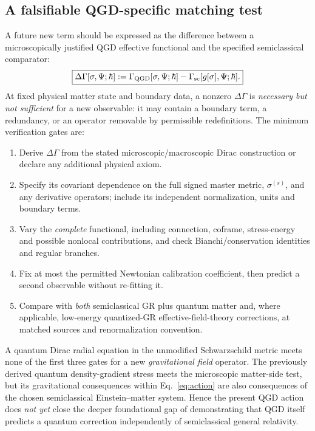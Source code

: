 \documentclass[11pt,a4paper]{article}
\begin{document}
\subsection{A falsifiable QGD-specific matching test}
\label{sec:delta-action}
A future new term should be expressed as the difference between a
microscopically justified QGD effective functional and the specified
semiclassical comparator:
\begin{equation}\label{eq:delta-gamma}
\boxed{\displaystyle
\Delta\Gamma[\sigma,\Psi;\hbar]
:=\Gamma_{\rm QGD}[\sigma,\Psi;\hbar]
-\Gamma_{\rm sc}[g[\sigma],\Psi;\hbar].}
\end{equation}
At fixed physical matter state and boundary data, a nonzero
$\Delta\Gamma$ is \emph{necessary but not sufficient} for a new
observable: it may contain a boundary term, a redundancy, or an
operator removable by permissible redefinitions. The minimum
verification gates are:
\begin{enumerate}
\item Derive $\Delta\Gamma$ from the stated microscopic/macroscopic
 Dirac construction or declare any additional physical axiom.
\item Specify its covariant dependence on the full signed master
 metric, $\sigma^{(s)}$, and any derivative operators; include its
 independent normalization, units and boundary terms.
\item Vary the \emph{complete} functional, including connection,
 coframe, stress-energy and possible nonlocal contributions, and
 check Bianchi/conservation identities and regular branches.
\item Fix at most the permitted Newtonian calibration coefficient,
 then predict a second observable without re-fitting it.
\item Compare with \emph{both} semiclassical GR plus quantum matter
 and, where applicable, low-energy quantized-GR effective-field-theory
 corrections, at matched sources and renormalization convention.
\end{enumerate}
A quantum Dirac radial equation in the unmodified Schwarzschild metric
meets none of the first three gates for a new \emph{gravitational
field} operator. The previously derived quantum density-gradient
stress meets the microscopic matter-side test, but its gravitational
consequences within Eq.~\eqref{eq:action} are also consequences of
the chosen semiclassical Einstein--matter system. Hence the present
QGD action does \emph{not yet} close the deeper foundational gap of
demonstrating that QGD itself predicts a quantum correction
independently of semiclassical general relativity.
\end{document}
